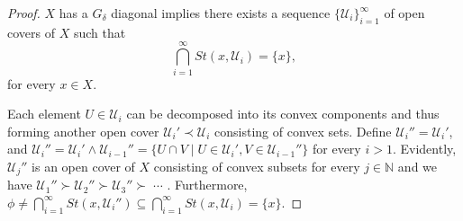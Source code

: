 \documentclass[12pt,oneside,english]{amsbook}
\numberwithin{equation}{section} %
\numberwithin{figure}{section} %
\theoremstyle{plain}
\numberwithin{section}{chapter}
\theoremstyle{plain}
\begin{document}
\begin{proof}
  $X$ has a $G_{\delta}$ diagonal implies there exists a sequence $\{ \mathcal{U}_{i} \}_{i = 1}^{\infty}$ of open covers of $X$ such that $$\bigcap_{i = 1}^{\infty}St(x, \mathcal{U}_{i}) = \{ x\},$$ for every $x \in X$. 

  Each element $U \in \mathcal{U}_i$ can be decomposed into its convex components and thus forming another open cover $\mathcal{U}_i' \prec \mathcal{U}_i$ consisting of convex sets. Define $\mathcal{U}_i'' = \mathcal{U}_i'$, and $\mathcal{U}_i'' = \mathcal{U}_i' \wedge \mathcal{U}_{i -1}'' = \{U \cap V \; | \; U \in \mathcal{U}_i', V \in \mathcal{U}_{i - 1}''\}$ for every $i > 1$. Evidently, $\mathcal{U}_j''$ is an open cover of $X$ consisting of convex subsets for every $j \in \mathbb{N}$ and we have $\mathcal{U}_{1}'' \succ \mathcal{U}_{2}'' \succ \mathcal{U}_{3}'' \succ \; \cdots$ .  Furthermore, $\phi \neq \bigcap_{i = 1}^{\infty}St(x, \mathcal{U}_{i}'') \subseteq \bigcap_{i = 1}^{\infty} St(x, \mathcal{U}_{i}) = \{ x \}$.
\end{proof}
\end{document}
